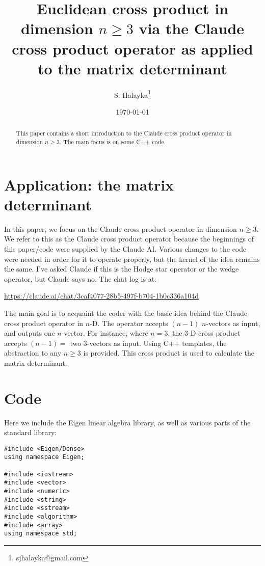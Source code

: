 \documentclass[12pt]{article}
\title{Euclidean cross product in dimension $n \ge 3$ via the Claude cross product operator as applied to the matrix determinant}
\author{S. Halayka\footnote{sjhalayka@gmail.com}}
\date{\today\;\currenttime}
\begin{document}
 
\maketitle

\begin{abstract}
This paper contains a short introduction to the Claude cross product operator in dimension $n \ge 3$.
The main focus is on some C++ code.
\end{abstract}




\section{Application: the matrix determinant}

In this paper, we focus on the Claude cross product operator in dimension $n \ge 3$.
We refer to this as the Claude cross product operator because the beginnings of this paper/code were supplied by the Claude AI.
Various changes to the code were needed in order for it to operate properly, but the kernel of the idea remains the same.
I've asked Claude if this is the Hodge star operator or the wedge operator, but Claude says no.
The chat log is at:

\url{https://claude.ai/chat/3caf4077-28b5-497f-b704-1b0c336a104d}

The main goal is to acquaint the coder with the basic idea behind the Claude cross product operator in $n$-D. 
The operator accepts $(n - 1)$ $n$-vectors as input, and outputs one $n$-vector.
For instance, where $n = 3$, the $3$-D cross product accepts $(n - 1) = $ two $3$-vectors as input.
Using C++ templates, the abstraction to any $n \ge 3$ is provided.
This cross product is used to calculate the matrix determinant.

\section{Code}

Here we include the Eigen linear algebra library, as well as various parts of the standard library:
\begin{lstlisting}
#include <Eigen/Dense>
using namespace Eigen;

#include <iostream>
#include <vector>
#include <numeric>
#include <string>
#include <sstream>
#include <algorithm>
#include <array>
using namespace std;
\end{lstlisting}
\end{document}
